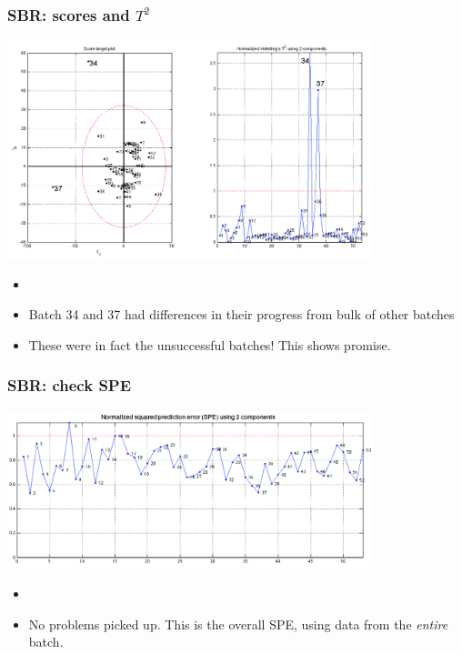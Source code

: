 \begin{frame}\frametitle{SBR: scores and \( T^2 \)}
	
	\begin{center}
		\includegraphics[width=0.8\textwidth]{images/sbr/SBR-scores-and-T2.png}
	\end{center}

	\begin{itemize}
		\item	{}
		
		\item	Batch 34 and 37 had differences in their progress from bulk of other batches\pause
		
		\item	These were in fact the unsuccessful batches!  This shows promise.
	\end{itemize}

\end{frame}

\begin{frame}\frametitle{SBR: check SPE}
	
	\begin{center}
		\includegraphics[width=0.8\textwidth]{images/sbr/SBR-SPE-plot-per-batch.png}
	\end{center}

	\begin{itemize}
		\item	{}
		
		\item	No problems picked up.  This is the overall SPE, using data from the \emph{entire} batch.
	\end{itemize}

\end{frame}

